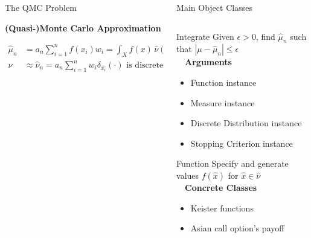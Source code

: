 \documentclass[final]{beamer}
\newcommand{\bfCenter}[1]{\centerline{\textbf{#1}}}
\newlength{\onecolwid}
\newlength{\twocolwid}
\newlength{\threecolwid}
\newcommand{\dif}{\mathrm{d}}
\begin{document}
\begin{frame}[t]
\begin{columns}[t]
\begin{column}{\threecolwid}
\begin{columns}[t,totalwidth=\threecolwid]
\begin{column}{\onecolwid}
\begin{block}{The QMC Problem}
    \vspace{2ex}
    \bfCenter{(Quasi-)Monte Carlo Approximation}
        \begin{align*}
            \hat{\mu}_n &= a_n \sum_{i=1}^{n} f(x_i)w_i =  \int_{X} f(x) \, \hat{\nu}( \dif x)
            \label{qmcApprox}
	\\ \nu & \approx \hat{\nu}_n = a_n \sum_{i=1}^n w_i \delta_{\hat{x_i}}(\cdot) 
            \text{ is discrete probability measure}
        \end{align*}
\end{block}
\end{column}


\begin{column}{\twocolwid}\vspace{-1in}
\begin{block}{Main Object Classes}
\begin{column}{\onecolwid}
\begin{alertblock}{Integrate}
    Given $\epsilon>0$, find $\hat{\mu}_n$ such that $\left | \mu - \hat{\mu}_n \right  | \leq \epsilon$ \\[1ex]~\
    \textbf{Arguments}
    \begin{itemize}
        \item Function instance
        \item Measure instance
        \item Discrete Distribution instance
        \item Stopping Criterion instance
    \end{itemize}
\end{alertblock}

\begin{alertblock}{Function}
    Specify and generate values $f(\hat{x})$ for $\hat{x} \in \hat{\nu}$ \\[1ex]~\
    \textbf{Concrete Classes}
    \begin{itemize}
        \item Keister functions \cite{keister1996multidimensional}
        \item Asian call option's payoff 
    \end{itemize}
\end{alertblock}


\end{column}
\end{block}
\end{column}
\end{columns}
\end{column}
\end{columns}
\end{frame}
\end{document}
